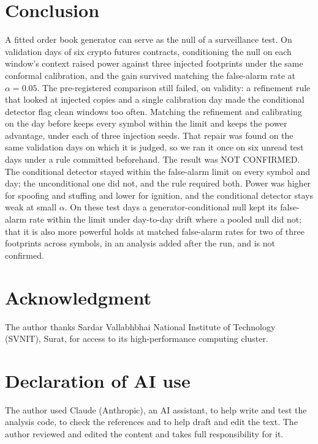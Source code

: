 \documentclass[journal]{IEEEtran}
\begin{document}
\section{Conclusion}
A fitted order book generator can serve as the null of a surveillance test. On validation days of six crypto
futures contracts, conditioning the null on each window's context raised power against three injected
footprints under the same conformal calibration, and the gain survived matching the false-alarm rate at
$\alpha=0.05$. The pre-registered comparison still failed, on validity: a refinement rule that looked at injected
copies and a single calibration day made the conditional detector flag clean windows too often. Matching the
refinement and calibrating on the day before keeps every symbol within the limit and keeps the power advantage,
under each of three injection seeds.
That repair was found on the same validation days on which it is judged, so we ran it once on six unread test
days under a rule committed beforehand. The result was NOT CONFIRMED. The conditional detector stayed
within the false-alarm limit on every symbol and day; the unconditional one did not, and the rule required both. Power was
higher for spoofing and stuffing and lower for ignition, and the conditional detector stays weak at small
$\alpha$. On these test days a generator-conditional null kept its false-alarm rate within the limit under day-to-day
drift where a pooled null did not;
that it is also more powerful holds at matched false-alarm rates for two of three footprints across symbols,
in an analysis added after the run, and is not confirmed.

\section*{Acknowledgment}
The author thanks Sardar Vallabhbhai National Institute of Technology (SVNIT), Surat, for access to its
high-performance computing cluster.

\section*{Declaration of AI use}
The author used Claude (Anthropic), an AI assistant, to help write and test the analysis code, to check the
references and to help draft and edit the text. The author reviewed and edited the content and takes full
responsibility for it.
\end{document}
